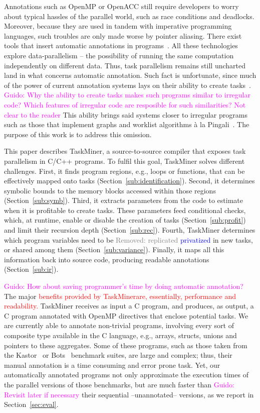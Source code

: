 \documentclass[sigplan,10pt,review,anonymous]{acmart}
\newcommand{\guido}[1]{\noindent\textcolor{magenta}{Guido: {#1}}}
\newcommand{\rmv}[1]{\noindent\textcolor{gray}{Removed: {#1}}}
\newcommand{\new}[1]{\noindent\textcolor{blue}{ {#1}}}
\newcommand{\ed}[1]{\noindent\textcolor{red}{ {#1}}}
\newcommand{\guido}[1]{}
\newcommand{\rmv}[1]{}
\newcommand{\new}[1]{#1}
\newcommand{\ed}[1]{}
\newcommand\Taskminer{\mbox{\textsf{TaskMiner}}}
\begin{document}
Annotations such as OpenMP or OpenACC still require developers to
worry about typical hassles of the parallel world, such as race conditions
and deadlocks.
Moreover, because they are used in tandem with imperative programming languages,
such troubles are only made worse by pointer aliasing.
There exist tools that insert automatic annotations in
programs~\cite{Amini12,Guelton12,Mendonca16,Pingali11,Nugteren14}.
All these technologies explore data-parallelism -- the possibility of running
the same computation independently on different data.
Thus, task parallelism remains still uncharted land in what concerns automatic
annotation. Such fact is unfortunate, since much of the power of current annotation
systems lays on their ability to create tasks~\cite{Ayguade09}.
\guido{Why the ability to create tasks makes such programs similar to irregular code?
Which features of irregular code are resposible for such similarities? Not clear to the 
reader}
This ability brings said systems closer to irregular programs such as those
that implement graphs and worklist algorithms \`{a} la
Pingali~\cite{Ben-Nun17,Kulkarni11,Pingali11}.
The purpose of this work is to address this omission.

This paper describes \Taskminer, a source-to-source compiler that exposes task
parallelism in C/C++ programs.
To fulfil this goal, \Taskminer{} solves different challenges.
First, it finds program regions, e.g., loops or functions, that can be
effectively mapped onto tasks (Section~\ref{sub:identification}).
Second, it determines symbolic bounds to the memory blocks accessed within
those regions (Section~\ref{sub:symb}).
Third, it extracts parameters from the code to estimate when it is profitable to
create tasks.
These parameters feed conditional checks, which, at runtime, enable or disable
the creation of tasks (Section~\ref{sub:profit}) and limit their recursion
depth (Section~\ref{sub:rec}).
Fourth, \Taskminer{} determines which program variables need to be 
\rmv{replicated} \new{privatized}  in new tasks, or shared among them (Section~\ref{sub:variance}).
Finally, it maps all this information back into source code, producing
readable annotations (Section~\ref{sub:ir}).

\guido{How about saving programmer's time by doing automatic annotation?}
The major \ed{benefits provided by \Taskminer are, essentially, performance and readability.}
\Taskminer{} receives as input a C program, and produces, as output, a C
program annotated with OpenMP directives that enclose potential tasks.
We are currently able to annotate non-trivial programs, involving every
sort of composite type available in the C language, e.g., arrays, structs,
unions and pointers to these aggregates.
Some of these programs, such as those taken from the
Kastor~\cite{Virouleau14} or Bots~\cite{Duran09}
benchmark suites, are large and complex; thus, their manual annotation is a
time consuming and error prone task.
Yet, our automatically annotated programs not only approximate the execution
times of the parallel versions of those benchmarks, but are much faster than
\guido{Revisit later if necessary}
their sequential --unannotated-- versions, as we report in Section~\ref{sec:eval}.
\end{document}
